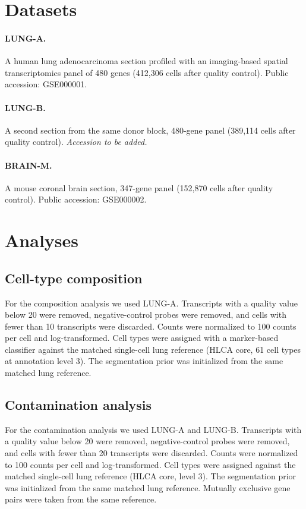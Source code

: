 \documentclass[11pt]{article}
\begin{document}
\section{Datasets}

\paragraph{LUNG-A.} A human lung adenocarcinoma section profiled with an imaging-based spatial transcriptomics panel of 480 genes (412,306 cells after quality control). Public accession: GSE000001.

\paragraph{LUNG-B.} A second section from the same donor block, 480-gene panel (389,114 cells after quality control). \textit{Accession to be added.}

\paragraph{BRAIN-M.} A mouse coronal brain section, 347-gene panel (152,870 cells after quality control). Public accession: GSE000002.

\section{Analyses}

\subsection{Cell-type composition}

For the composition analysis we used LUNG-A. Transcripts with a quality value below 20 were removed, negative-control probes were removed, and cells with fewer than 10 transcripts were discarded. Counts were normalized to 100 counts per cell and log-transformed. Cell types were assigned with a marker-based classifier against the matched single-cell lung reference (HLCA core, 61 cell types at annotation level 3). The segmentation prior was initialized from the same matched lung reference.

\subsection{Contamination analysis}

For the contamination analysis we used LUNG-A and LUNG-B. Transcripts with a quality value below 20 were removed, negative-control probes were removed, and cells with fewer than 20 transcripts were discarded. Counts were normalized to 100 counts per cell and log-transformed. Cell types were assigned against the matched single-cell lung reference (HLCA core, level 3). The segmentation prior was initialized from the same matched lung reference. Mutually exclusive gene pairs were taken from the same reference.
\end{document}
